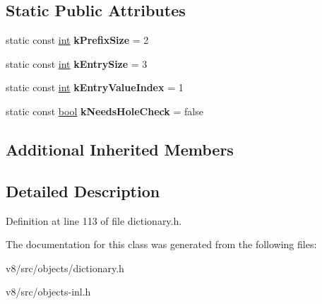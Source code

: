 \subsection*{Static Public Attributes}
\begin{DoxyCompactItemize}
\item 
\mbox{\label{classv8_1_1internal_1_1NameDictionaryShape_a1a90f5c9fdff6b8e651e80362ecaa7c2}} 
static const \mbox{\hyperlink{classint}{int}} {\bfseries k\+Prefix\+Size} = 2
\item 
\mbox{\label{classv8_1_1internal_1_1NameDictionaryShape_a4420336fb2913279eebec9f27a8a1334}} 
static const \mbox{\hyperlink{classint}{int}} {\bfseries k\+Entry\+Size} = 3
\item 
\mbox{\label{classv8_1_1internal_1_1NameDictionaryShape_ab56cded69a32767eb989bfbc69199432}} 
static const \mbox{\hyperlink{classint}{int}} {\bfseries k\+Entry\+Value\+Index} = 1
\item 
\mbox{\label{classv8_1_1internal_1_1NameDictionaryShape_aad8a1a9dc81f49958ffd8911972351ae}} 
static const \mbox{\hyperlink{classbool}{bool}} {\bfseries k\+Needs\+Hole\+Check} = false
\end{DoxyCompactItemize}
\subsection*{Additional Inherited Members}


\subsection{Detailed Description}


Definition at line 113 of file dictionary.\+h.



The documentation for this class was generated from the following files\+:\begin{DoxyCompactItemize}
\item 
v8/src/objects/dictionary.\+h\item 
v8/src/objects-\/inl.\+h\end{DoxyCompactItemize}
